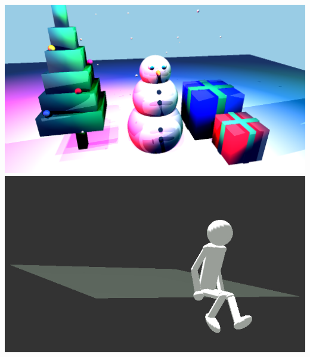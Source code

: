 \documentclass{article}
\begin{document}
\hfill
\includegraphics[width=0.4\linewidth]{ex2.png}
\hfill
\includegraphics[width=0.4\linewidth]{ex.png}
\hfill
\end{document}

